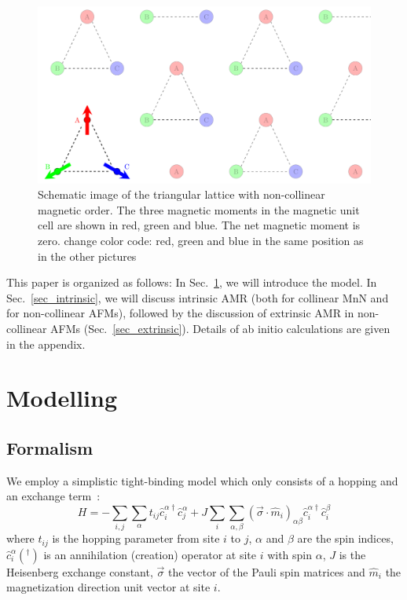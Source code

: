\documentclass[prb,showpacs,amsmath,amssymb,superscriptaddress,twocolumn,floatfix]{revtex4-1}
\begin{document}
\begin{figure}
	\centering
	\includegraphics[width=0.7\linewidth]{img/Trigonal_11}
	\caption{Schematic image of the triangular lattice with non-collinear magnetic order. The three magnetic moments in the magnetic unit cell are shown in red, green and blue. The net magnetic moment is zero. {\color{red} change color code: red, green and blue in the same position as in the other pictures }}
	\label{fig:trigonal11}
\end{figure}


This paper is organized as follows: In Sec.~\ref{sec_modelling}, we
will introduce the model. In Sec.~\ref{sec_intrinsic}, we will discuss
intrinsic AMR (both for collinear MnN and for non-collinear AFMs),
followed by the discussion of extrinsic AMR in non-collinear AFMs
(Sec.~\ref{sec_extrinsic}). Details of ab initio calculations are
given in the appendix.



\section{Modelling}
\label{sec_modelling}

\subsection{Formalism}

We employ a simplistic tight-binding model which only consists of a hopping and an exchange term~\cite{Gonzalez-Hernandez:2024}:
\begin{equation}
H = -\sum_{i, j}\sum_\alpha t_{ij} {\hat{c}_i^{\alpha\dagger}} \hat{c}^\alpha_j + J \sum_{i} \sum_{\alpha, \beta} (\vec{\sigma} \cdot \hat{m}_i)_{\alpha \beta} {\hat{c}_i^{\alpha\dagger}} \hat{c}^\beta_i 
	\label{eq_sdmodel}
\end{equation} 
where $t_{ij}$ is the hopping parameter from site $i$ to $j$, $\alpha$ and $\beta$ are the spin indices, ${\hat{c}_i^{\alpha}}(^\dagger)$ is an annihilation (creation) operator at site $i$ with spin $\alpha$, $J$ is the Heisenberg exchange constant, $\vec{\sigma}$ the vector of the Pauli spin matrices and $\hat{m}_i$ the magnetization direction unit vector at site $i$.
\end{document}
